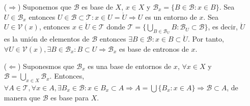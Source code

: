 \begin{dem}
  \begin{enumerate}[label=(\roman*)]
    \item [($\Rightarrow$)] Suponemos que $\mathcal{B}$ es base de $X$, $x \in X$ y $\mathcal{B}_{x} = \{ B \in \mathcal{B} : x \in B \}$. Sea $U \in \mathcal{B}_{x}$ entonces $ U \in \mathcal{B} \subset \mathcal{T}: x \in U = \mathring{U} \Rightarrow U$ es un entorno de $x$. Sea $U \in \mathcal{V}(x)$, entonces $x \in \mathring{U}\in \mathcal{T}$ donde $\mathcal{T} = \{ \bigcup_{B \in \mathcal{B}_{U}} B : \mathcal{B}_{U} \subset \mathcal{B} \}$, es decir, $\mathring{U}$ es la unión de elementos de $\mathcal{B}$ entonces $\exists B \in \mathcal{B}: x \in B \subset \mathring{U}$. Por tanto, $\forall U \in \mathcal{V}(x), \exists B \in \mathcal{B}_{x} : B \subset U \Rightarrow \mathcal{B}_{x}$ es base de entronos de $x$.
    \item [($\Leftarrow$)] Suponesmos que $\mathcal{B}_{x}$ es una base de entornos de $x$, $\forall x \in X$ y $\mathcal{B} = \bigcup_{x \in X} \mathcal{B}_{x}$. Entonces, $\forall A \in \mathcal{T}, \forall x \in A , \exists B_{x} \in \mathcal{B} : x \in B_{x} \subset A \Rightarrow A = \bigcup \{ B_{x} : x \in A \} \Rightarrow \mathcal{B} \subset A$, de manera que $\mathcal{B}$ es base para $X$.
  \end{enumerate}
\end{dem}
